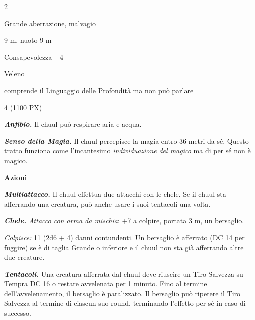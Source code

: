 \begin{multicols}{2}
{
\begin{description}[noitemsep, topsep=0pt, parsep=0pt, partopsep=0pt, itemsep=1pt, leftmargin=2.35cm,  labelwidth=2.2cm, itemindent=0cm, listparindent=0pt] %
\setlength{\baselineskip}{10pt}
\item[\textbf{Taglia/Tipo}] Grande aberrazione, malvagio
\item[\textbf{Caratt.}] 
\item[\textbf{Punti Ferita}] 
\item[\textbf{Movimento}] 9 m, nuoto 9 m
\item[\textbf{Tiri Salvez.}] 
\item[\textbf{Comp.}] Consapevolezza +4
\item[\textbf{Imm. Danni}] Veleno
\item[\textbf{Sensi}] 
\item[\textbf{Linguaggi}] comprende il Linguaggio delle Profondità ma non può parlare
\item[\textbf{Sfida}] 4 (1100 PX)
\end{description}
\smallskip

\emph{\textbf{Anfibio.}} Il chuul può respirare aria e acqua.

\emph{\textbf{Senso della Magia.}} Il chuul percepisce la magia entro 36 metri da sé. Questo tratto funziona come l'incantesimo \emph{individuazione} \emph{del magico} ma di per sé non è magico.

\textbf{Azioni}

\emph{\textbf{Multiattacco.}} Il chuul effettua due attacchi con le chele. Se il chuul sta afferrando una creatura, può anche usare i suoi tentacoli una volta.

\emph{\textbf{Chele.} Attacco con arma da mischia}: +7 a colpire, portata 3 m, un bersaglio.

\emph{Colpisce:} 11 (2d6 + 4) danni contundenti. Un bersaglio è afferrato (DC 14 per fuggire) se è di taglia Grande o inferiore e il chuul non sta già afferrando altre due creature.

\emph{\textbf{Tentacoli.}} Una creatura afferrata dal chuul deve riuscire un Tiro Salvezza su Tempra DC 16 o restare avvelenata per 1 minuto. Fino al termine dell'avvelenamento, il bersaglio è paralizzato. Il bersaglio può ripetere il Tiro Salvezza al termine di ciascun suo round, terminando l'effetto per sé in caso di successo.

}
\end{multicols}
